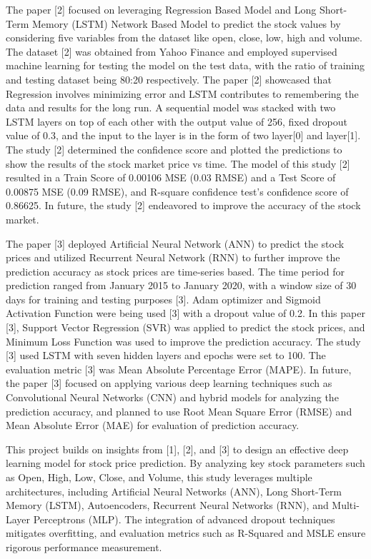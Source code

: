 \documentclass[conference]{IEEEtran}
\begin{document}
The paper [2] focused on leveraging Regression Based Model and Long Short-Term Memory (LSTM) Network Based Model to predict the stock values by considering five variables from the dataset like open, close, low, high and volume. The dataset [2] was obtained from Yahoo Finance and employed supervised machine learning for testing the model on the test data, with the ratio of training and testing dataset being 80:20 respectively. The paper [2] showcased that Regression involves minimizing error and LSTM contributes to remembering the data and results for the long run. A sequential model was stacked with two LSTM layers on top of each other with the output value of 256, fixed dropout value of 0.3, and the input to the layer is in the form of two layer[0] and layer[1]. The study [2] determined the confidence score and plotted the predictions to show the results of the stock market price vs time. The model of this study [2] resulted in a Train Score of 0.00106 MSE (0.03 RMSE) and a Test Score of 0.00875 MSE (0.09 RMSE), and R-square confidence test’s confidence score of 0.86625. In future, the study [2] endeavored to improve the accuracy of the stock market.

The paper [3] deployed Artificial Neural Network (ANN) to predict the stock prices and utilized Recurrent Neural Network (RNN) to further improve the prediction accuracy as stock prices are time-series based. The time period for prediction ranged from January 2015 to January 2020, with a window size of 30 days for training and testing purposes [3]. Adam optimizer and Sigmoid Activation Function were being used [3] with a dropout value of 0.2. In this paper [3], Support Vector Regression (SVR) was applied to predict the stock prices, and Minimum Loss Function was used to improve the prediction accuracy. The study [3] used LSTM with seven hidden layers and epochs were set to 100. The evaluation metric [3] was Mean Absolute Percentage Error (MAPE). In future, the paper [3] focused on applying various deep learning techniques such as Convolutional Neural Networks (CNN) and hybrid models for analyzing the prediction accuracy, and planned to use Root Mean Square Error (RMSE) and Mean Absolute Error (MAE) for evaluation of prediction accuracy.

This project builds on insights from [1], [2], and [3] to design an effective deep learning model for stock price prediction. By analyzing key stock parameters such as Open, High, Low, Close, and Volume, this study leverages multiple architectures, including Artificial Neural Networks (ANN), Long Short-Term Memory (LSTM), Autoencoders, Recurrent Neural Networks (RNN), and Multi-Layer Perceptrons (MLP). The integration of advanced dropout techniques mitigates overfitting, and evaluation metrics such as R-Squared and MSLE ensure rigorous performance measurement. 
\end{document}
